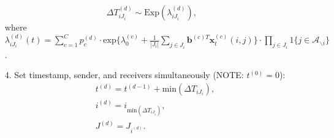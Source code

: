 \documentclass[a4paper]{article}
\begin{document}
\begin{itemize}
\begin{equation}
\Delta T^{(d)}_{i{J_i}} \sim \mbox{Exp}(\lambda_{i{J_i}}^{(d)}),
	\end{equation}
where $\lambda^{(d)}_{iJ_i}(t)= \sum\limits_{c=1}^{C} p^{(d)}_c\cdot\mbox{exp}\Big\{\lambda^{(c)}_0+\frac{1}{|J_i|}\sum\limits_{j \in J_i} \boldsymbol{b}^{(c)T}\boldsymbol{x}^{(c)}_t(i, j)\Big\}\cdot \prod\limits_{j \in J_i}1\{j \in \mathcal{A}_{\backslash i}\}$.
	 	 \item[4.] Set timestamp, sender, and receivers simultaneously (NOTE: $t^{(0)}=0$):
	 	 \begin{equation}
	 	 \begin{aligned}
	 	 &t^{(d)} = t^{(d-1)}+\mbox{min}(\Delta T_{i{J_i}}),\\
	 	  &i^{(d)} = i_{\mbox{min}(\Delta T_{i{J_i}})}, \\
	 	  &J^{(d)} = J_{i^{(d)}}.
	 	  \end{aligned}
	 	 \end{equation}
\end{itemize}
\end{document}
